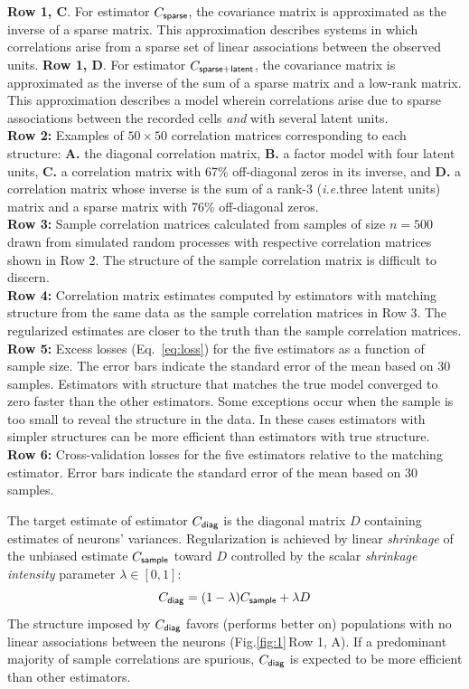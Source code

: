 \documentclass[10pt]{article}
\newcommand{\figref}[2]{Fig.\;\ref{fig:#1}\,#2}
\newcommand{\ie}{\emph{i.e.}\;}
\begin{document}
\begin{FPfigure}
{        {\bf  Row 1, C}. For estimator $C_{\sf sparse}$, the covariance matrix is approximated as the inverse of a sparse matrix. This approximation describes systems in which correlations arise from a sparse set of  linear associations between the observed units. 
        {\bf  Row 1, D}.  For estimator $C_{\sf sparse+latent}$, the covariance matrix is approximated as the inverse of the sum of a sparse matrix and a low-rank matrix. This approximation describes a model wherein correlations arise due to sparse associations between the recorded cells \emph{and} with several latent units. \\
{\bf Row 2:} Examples of $50\times 50$ correlation matrices corresponding to each structure: {\bf A.} the diagonal correlation matrix, {\bf B.} a factor model with four latent units, {\bf C.}  a correlation matrix with 67\%  off-diagonal zeros in its inverse, and {\bf  D.} a correlation matrix whose inverse is the sum of a rank-3 (\ie three latent units) matrix and a sparse matrix with 76\% off-diagonal zeros. 
\\
{\bf Row 3:} Sample correlation matrices calculated from samples of size $n=500$ drawn from simulated random processes with respective correlation matrices shown in Row 2.  The structure of the sample correlation matrix is difficult to discern.
\\
{\bf Row 4:} Correlation matrix estimates computed by estimators with matching structure from the same data as the sample correlation matrices in Row 3. The regularized estimates are closer to the truth than the sample correlation matrices.
\\
{\bf Row 5:} Excess losses (Eq.~\ref{eq:loss}) for the five estimators as a function of sample size. The error bars indicate the standard error of the mean based on 30 samples.  Estimators with structure that matches the true model converged to zero faster than the other estimators. Some exceptions occur when the sample is too small to reveal the structure in the data. In these cases estimators with simpler structures can be more efficient than estimators with true structure.
\\
{\bf Row 6:} Cross-validation losses for the five estimators relative to the matching estimator. Error bars indicate the standard error of the mean based on 30 samples.
    }
    \label{fig:1}
\end{FPfigure} 

The target estimate of estimator $C_{\sf diag}$ is the diagonal matrix $D$ containing estimates of neurons' variances. Regularization is achieved by linear \emph{shrinkage} of the unbiased estimate $C_{\sf sample}$ toward $D$ controlled by the scalar \emph{shrinkage intensity} parameter $\lambda \in [0, 1]$:
\begin{equation}\label{eq:c-diag}
C_{\sf diag} = (1-\lambda) C_{\sf sample} + \lambda D
\end{equation}
The structure imposed by $C_{\sf diag}$ favors (performs better  on) populations   with no linear associations between the neurons (\figref{1}{Row 1, A}).  If a predominant majority of sample correlations are spurious, $C_{\sf diag}$ is expected to be more efficient than other estimators. 
\end{document}
